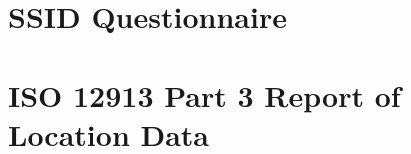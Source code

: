 \documentclass[twoside,fontsize=12pt,titlepage,chapterprefix=true
]{scrbook}
\begin{document}





 \backmatter
 \printglossaries

 


\begin{appendices}

 \chapter{SSID Questionnaire}\label{app:questionnaire}
 

 \chapter{ISO 12913 Part 3 Report of Location Data}\label{app:location-data}
      

 

 

\end{appendices}

\end{document}
